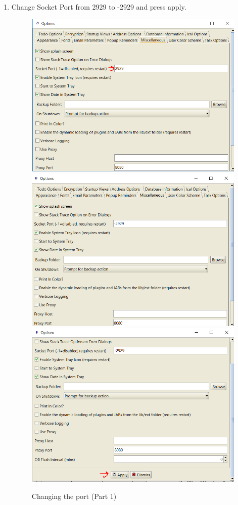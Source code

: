 \documentclass[fontsize=12pt,paper=letter,twoside]{scrartcl}
\begin{document}
\begin{itemize}
\begin{itemize}
\begin{enumerate}
\item{Change Socket Port from 2929 to -2929 and press apply.}
\begin{figure}[!htb]
\begin{center}
\includegraphics[width=.4\textwidth]{images/bbt/bvt-step4.png}
\includegraphics[width=.4\textwidth]{images/bbt/bvt-step4p2.png}
\includegraphics[width=.4\textwidth]{images/bbt/bvt-step5.png}
\end{center}
\caption{Changing the port (Part 1)}
\label{fig:bbt_bvtstep4}
\end{figure}


\end{enumerate}
\end{itemize}
\end{itemize}
\end{document}

